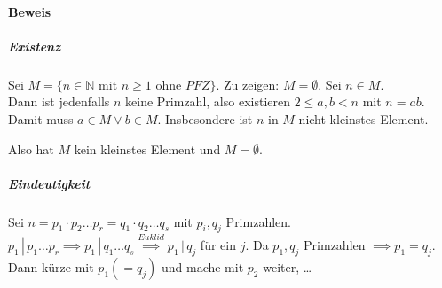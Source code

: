 \documentclass[14pt,a4paper]{article}
\newcommand{\N}{\ensuremath{\mathbb{N}}}
\begin{document}
			\paragraph{Beweis}
				\subparagraph{Existenz}
					Sei $ M = \{ n \in \N \text{ mit } n \ge 1 \text{ ohne } PFZ \} $. Zu zeigen: $ M = \emptyset $.
					Sei $ n \in M $.\\
					Dann ist jedenfalls $n$ keine Primzahl, also existieren $ 2 \le a,b < n $ mit $ n = ab $.
					Damit muss $ a \in M \lor b \in M $.
					Insbesondere ist $ n $ in $ M $ nicht kleinstes Element.

					Also hat $ M $ kein kleinstes Element und $ M = \emptyset $.

				\subparagraph{Eindeutigkeit}
					Sei $ n = p_1 \cdot p_2 \dots p_r = q_1 \cdot q_2 \dots q_s $ mit $p_i, q_j $ Primzahlen.\\
					$ p_1 \, | \, p_1 \dots p_r \implies p_1 \, | \, q_1 \dots q_s \stackrel{Euklid}{\implies} p_1 \, | \, q_j $ für ein $ j $. Da $p_1, q_j$ Primzahlen $\implies p_1 = q_j$.
					Dann kürze mit $ p_1 ( = q_j ) $ und mache mit $ p_2 $ weiter, …
\end{document}
